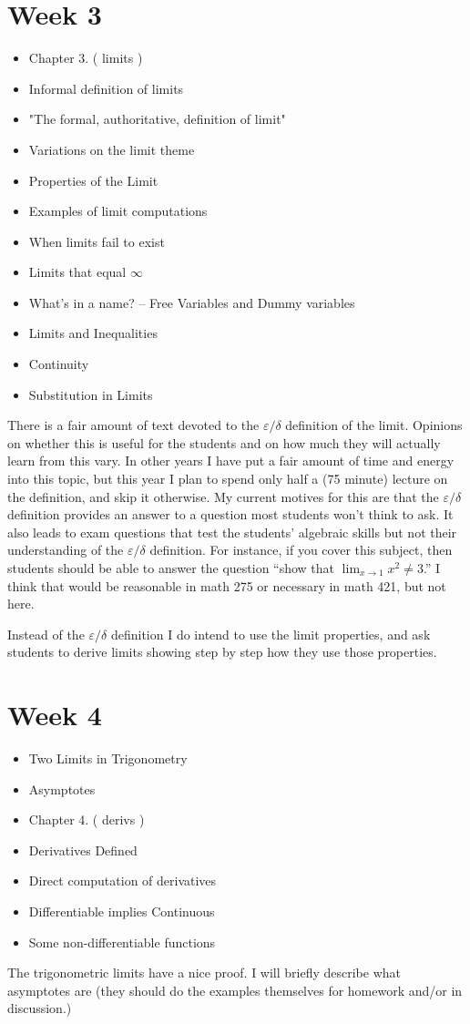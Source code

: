 \documentclass{amsproc}
\begin{document}
\section*{Week 3}
\begin{itemize}
\item Chapter 3. ( limits )
\item Informal definition of limits
\item "The formal, authoritative, definition of limit"
\item Variations on the limit theme
\item Properties of the Limit
\item Examples of limit computations
\item When limits fail to exist
\item Limits that equal $\infty$
\item What's in a name? -- Free Variables and Dummy variables
\item Limits and Inequalities
\item Continuity
\item Substitution in Limits
\end{itemize}
There is a fair amount of text devoted to the $\varepsilon/\delta$ definition of
the limit.  Opinions on whether this is useful for the students and on how much
they will actually learn from this vary.  In other years I have put a fair
amount of time and energy into this topic, but this year I plan to spend only half a
(75 minute) lecture on the definition, and skip it otherwise. 
My current motives for this are that the $\varepsilon/\delta$ definition
provides an answer to a question most students won't think to ask.  It also
leads to exam questions that test the students' algebraic skills but not their
understanding of the $\varepsilon/\delta$ definition.  For instance, if you cover this
subject, then students should be able to answer the question ``show that
$\lim_{x\to 1} x^2 \neq 3$.''  I think that would be reasonable in math 275 or
necessary in math 421, but not here.

Instead of the $\varepsilon/\delta$ definition I do intend to use the limit
properties, and ask students to derive limits showing step by step how they use
those properties.

\section*{Week 4}
\begin{itemize}
\item Two Limits in Trigonometry
\item Asymptotes
\item Chapter 4. ( derivs )
\item Derivatives Defined
\item Direct computation of derivatives
\item Differentiable implies Continuous
\item Some non-differentiable functions
\end{itemize}
The trigonometric limits have a nice proof.  I will briefly describe what
asymptotes are (they should do the examples themselves for homework and/or in
discussion.)
\end{document}
